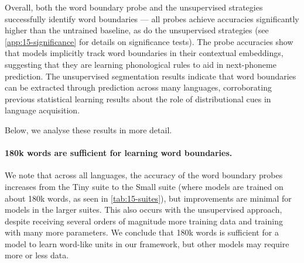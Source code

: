 Overall, both the word boundary probe and the unsupervised strategies successfully identify word boundaries --- all probes achieve accuracies significantly higher than the untrained baseline, as do the unsupervised strategies (see \cref{app:15-significance} for details on significance tests). The probe accuracies show that models implicitly track word boundaries in their contextual embeddings, suggesting that they are learning phonological rules to aid in next-phoneme prediction. The unsupervised segmentation results indicate that word boundaries can be extracted through prediction across many languages, corroborating previous statistical learning results about the role of distributional cues in language acquisition.

Below, we analyse these results in more detail.

\paragraph{180k words are sufficient for learning word boundaries.}
We note that across all languages, the accuracy of the word boundary probes increases from the Tiny suite to the Small suite (where models are trained on about 180k words, as seen in \cref{tab:15-suites}), but improvements are minimal for models in the larger suites. This also occurs with the unsupervised approach, despite receiving several orders of magnitude more training data and training with many more parameters. We conclude that 180k words is sufficient for a model to learn word-like units in our framework, but other models may require more or less data. 




